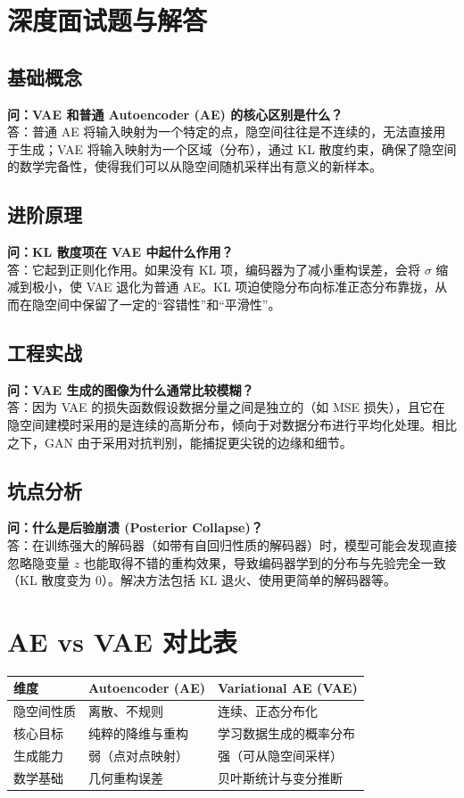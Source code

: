 \documentclass[12pt, a4paper]{article}
\begin{document}
\section{深度面试题与解答}
\subsection{基础概念}
\textbf{问：VAE 和普通 Autoencoder (AE) 的核心区别是什么？}\\
答：普通 AE 将输入映射为一个特定的点，隐空间往往是不连续的，无法直接用于生成；VAE 将输入映射为一个区域（分布），通过 KL 散度约束，确保了隐空间的数学完备性，使得我们可以从隐空间随机采样出有意义的新样本。

\subsection{进阶原理}
\textbf{问：KL 散度项在 VAE 中起什么作用？}\\
答：它起到正则化作用。如果没有 KL 项，编码器为了减小重构误差，会将 $\sigma$ 缩减到极小，使 VAE 退化为普通 AE。KL 项迫使隐分布向标准正态分布靠拢，从而在隐空间中保留了一定的“容错性”和“平滑性”。

\subsection{工程实战}
\textbf{问：VAE 生成的图像为什么通常比较模糊？}\\
答：因为 VAE 的损失函数假设数据分量之间是独立的（如 MSE 损失），且它在隐空间建模时采用的是连续的高斯分布，倾向于对数据分布进行平均化处理。相比之下，GAN 由于采用对抗判别，能捕捉更尖锐的边缘和细节。

\subsection{坑点分析}
\textbf{问：什么是后验崩溃 (Posterior Collapse)？}\\
答：在训练强大的解码器（如带有自回归性质的解码器）时，模型可能会发现直接忽略隐变量 $z$ 也能取得不错的重构效果，导致编码器学到的分布与先验完全一致（KL 散度变为 0）。解决方法包括 KL 退火、使用更简单的解码器等。

\section{AE vs VAE 对比表}

\begin{table}[h]
\centering
\begin{tabularx}{\textwidth}{|l|X|X|}
\hline
\textbf{维度} & \textbf{Autoencoder (AE)} & \textbf{Variational AE (VAE)} \\
\hline
隐空间性质 & 离散、不规则 & 连续、正态分布化 \\
\hline
核心目标 & 纯粹的降维与重构 & 学习数据生成的概率分布 \\
\hline
生成能力 & 弱（点对点映射） & 强（可从隐空间采样） \\
\hline
数学基础 & 几何重构误差 & 贝叶斯统计与变分推断 \\
\hline
\end{tabularx}
\end{table}
\end{document}
